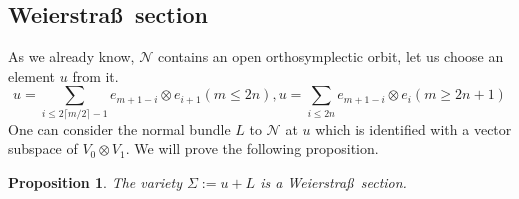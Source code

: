 \documentclass[12pt]{amsart}
\newtheorem{prop}[thm]{Proposition}
\theoremstyle{definition}
\theoremstyle{remark}
\numberwithin{equation}{subsection}
\begin{document}
\subsection{Weierstra\ss\ section}
As we already know, $\mathcal{N}$ contains an open orthosymplectic orbit, let us choose an element $u$ from it. 
\begin{equation}
    u=\sum_{i\le 2\lceil m/2 \rceil -1} e_{m+1-i}\otimes e_{i+1} (m\le 2n), u=\sum_{i\le 2n} e_{m+1-i}\otimes e_{i} (m\ge 2n+1)
\end{equation}
One can consider the normal bundle $L$ to $\mathcal{N}$ at $u$ which is identified with a vector subspace of $V_0 \otimes V_1$. We will prove the following proposition.\\
\begin{prop}
  \label{prop1}
  The variety $\Sigma :=u+L$ is a Weierstra\ss\ section.
  \end{prop}
\end{document}
